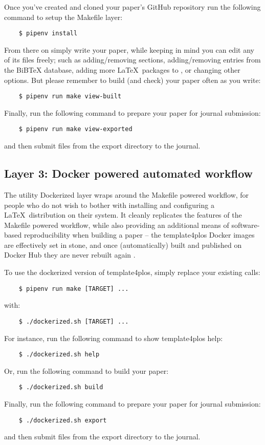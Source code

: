 Once you've created and cloned your paper's GitHub repository run the following command to setup the Makefile layer:
\begin{verbatim}
    $ pipenv install
\end{verbatim}

From there on simply write your paper, while keeping in mind you can edit any of its files freely; such as adding/removing sections, adding/removing entries from the  BiBTeX database, adding more \LaTeX~packages to , or changing other options.
But please remember to build (and check) your paper often as you write:
\begin{verbatim}
    $ pipenv run make view-built
\end{verbatim}

\noindent
Finally, run the following command to prepare your paper for journal submission:
\begin{verbatim}
    $ pipenv run make view-exported
\end{verbatim}
and then submit files from the export directory to the journal.

\subsection*{Layer 3: Docker powered automated workflow}

The utility Dockerized layer wraps around the Makefile powered workflow, for people who do not wish to bother with installing and configuring a \LaTeX~distribution on their system.
It cleanly replicates the features of the Makefile powered workflow, while also providing an additional means of software-based reproducibility when building a paper -- the template4plos Docker images are effectively set in stone, and once (automatically) built and published on Docker Hub they are never rebuilt again \cite{template4plos:DockerHub:tags}.

To use the dockerized version of template4plos, simply replace your existing  calls:

\begin{verbatim}
    $ pipenv run make [TARGET] ...
\end{verbatim}
with:
\begin{verbatim}
    $ ./dockerized.sh [TARGET] ...
\end{verbatim}

\noindent
For instance, run the following command to show template4plos help:
\begin{verbatim}
    $ ./dockerized.sh help
\end{verbatim}

\noindent
Or, run the following command to build your paper:
\begin{verbatim}
    $ ./dockerized.sh build
\end{verbatim}

\noindent
Finally, run the following command to prepare your paper for journal submission:
\begin{verbatim}
    $ ./dockerized.sh export
\end{verbatim}
and then submit files from the export directory to the journal.
